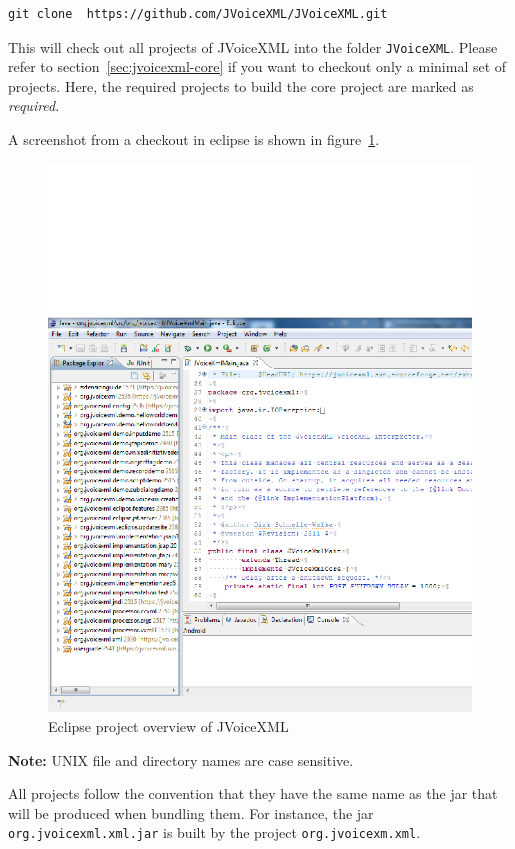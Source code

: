 \documentclass[11pt,a4paper]{article}
\begin{document}
\begin{lstlisting}
git clone  https://github.com/JVoiceXML/JVoiceXML.git
\end{lstlisting}

This will check out all projects of JVoiceXML
into the folder \texttt{JVoiceXML}. Please refer to
section~\ref{sec:jvoicexml-core} if you want to checkout
only a minimal set of projects. Here, the required projects
to build the core project are marked as \emph{required}.

A screenshot from a checkout in eclipse is shown in
figure~\ref{fig:eclipse-projects}.
\begin{figure}
\includegraphics[width=\linewidth]{eclipse-projects.png}
\caption{Eclipse project overview of JVoiceXML}
\label{fig:eclipse-projects}
\end{figure}

\textbf{Note:} UNIX file and directory names are case sensitive.

All projects follow the convention that they have the same name as the jar
that will be produced when bundling them. For instance, the jar \lstinline{org.jvoicexml.xml.jar}
is built by the project \lstinline{org.jvoicexm.xml}.
\end{document}
